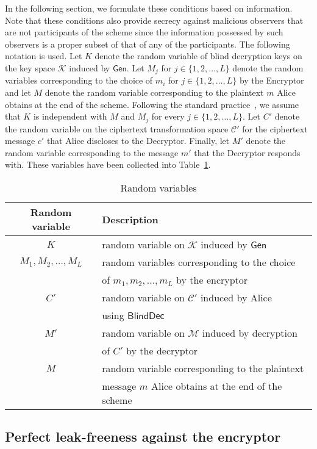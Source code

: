 \documentclass[10pt,journal]{IEEEtran}
\newcommand{\alg}[1]{\mathsf{#1}}
\begin{document}
In the following section, we formulate these conditions based on information. Note that these
conditions also provide secrecy against malicious observers that are not participants of the
scheme since the information possessed by such observers is a proper subset of that of any of the participants.
The following
notation is used.
Let $K$
denote the random variable of blind decryption keys on the key space $\mathcal{K}$
induced by $\alg{Gen}$.
Let $M_j$ for $j \in \{1,2,\ldots,L\}$ denote
the random variables corresponding to the choice of $m_i$ for $j \in \{1,2,\ldots,L\}$
by the Encryptor and let $M$ denote the random variable corresponding to the plaintext $m$
Alice obtains at the end of the scheme. Following the standard practice~\cite{Katz_2007}, we assume that $K$ is independent
with $M$ and $M_j$ for every $j \in \{1,2,\ldots,L\}$.
Let $C'$ denote the random variable on the ciphertext transformation space $\mathcal{C'}$
for the ciphertext message $c'$ that Alice discloses to the Decryptor.
Finally, let $M'$ denote the random variable corresponding to the message $m'$
that the Decryptor responds with. These variables have been collected into Table~\ref{tab:Table of random variables}.
\begin{table}
\caption{Random variables}
\begin{tabular}{|c|l|}
\hline
Random variable & Description\\
\hline
\hline
$K$ & random variable on $\mathcal{K}$ induced by $\alg{Gen}$ \\
$M_1,M_2,\ldots,M_L$ & random variables corresponding to the choice\\ & of $m_1,m_2,\ldots,m_L$ by the encryptor\\
$C'$ & random variable on $\mathcal{C'}$ induced by Alice\\ & using $\alg{BlindDec}$\\
$M'$ & random variable on $\mathcal{M}$ induced by decryption\\ & of $C'$ by the decryptor\\
$M$ & random variable corresponding to the plaintext\\ &  message $m$ Alice obtains at the end of the scheme\\
\hline
\end{tabular}
\vspace{4pt}
\label{tab:Table of random variables}
\end{table}



\subsection{Perfect leak-freeness against the encryptor}
\end{document}
